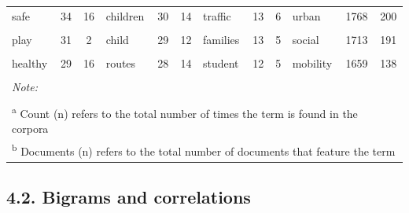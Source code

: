 \documentclass[]{elsarticle} %
\begin{document}
\begin{table}
{\begin{tabular}[t]{lcclcclcclcc}
safe & 34 & 16 & children & 30 & 14 & traffic & 13 & 6 & urban & 1768 & 200\\
\addlinespace
\cellcolor{gray!6}{benefits} & \cellcolor{gray!6}{32} & \cellcolor{gray!6}{17} & \cellcolor{gray!6}{day} & \cellcolor{gray!6}{29} & \cellcolor{gray!6}{13} & \cellcolor{gray!6}{support} & \cellcolor{gray!6}{13} & \cellcolor{gray!6}{6} & \cellcolor{gray!6}{home} & \cellcolor{gray!6}{1715} & \cellcolor{gray!6}{199}\\
play & 31 & 2 & child & 29 & 12 & families & 13 & 5 & social & 1713 & 191\\
\cellcolor{gray!6}{resources} & \cellcolor{gray!6}{30} & \cellcolor{gray!6}{13} & \cellcolor{gray!6}{cancellations} & \cellcolor{gray!6}{29} & \cellcolor{gray!6}{13} & \cellcolor{gray!6}{way} & \cellcolor{gray!6}{12} & \cellcolor{gray!6}{5} & \cellcolor{gray!6}{different} & \cellcolor{gray!6}{1713} & \cellcolor{gray!6}{215}\\
healthy & 29 & 16 & routes & 28 & 14 & student & 12 & 5 & mobility & 1659 & 138\\
\cellcolor{gray!6}{routes} & \cellcolor{gray!6}{27} & \cellcolor{gray!6}{13} & \cellcolor{gray!6}{physical} & \cellcolor{gray!6}{28} & \cellcolor{gray!6}{11} & \cellcolor{gray!6}{region} & \cellcolor{gray!6}{12} & \cellcolor{gray!6}{4} & \cellcolor{gray!6}{significant} & \cellcolor{gray!6}{1650} & \cellcolor{gray!6}{208}\\
\bottomrule
\multicolumn{12}{l}{\rule{0pt}{1em}\textit{Note: }}\\
\multicolumn{12}{l}{\rule{0pt}{1em} }\\
\multicolumn{12}{l}{\rule{0pt}{1em}\textsuperscript{a} Count (n) refers to the total number of times the term is found in the corpora}\\
\multicolumn{12}{l}{\rule{0pt}{1em}\textsuperscript{b} Documents (n) refers to the total number of documents that feature the term}\\
\end{tabular}}
\end{table}

\hypertarget{bigrams-and-correlations}{%
\subsection{4.2. Bigrams and
correlations}\label{bigrams-and-correlations}}
\end{document}
